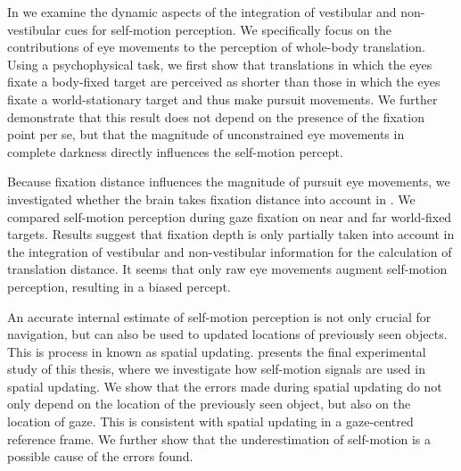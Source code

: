 In  we examine the dynamic aspects of the integration of vestibular and non-vestibular cues for self-motion perception. We specifically focus on the contributions of eye movements to the perception of whole-body translation. Using a psychophysical task, we first show that translations in which the eyes fixate a body-fixed target are perceived as shorter than those in which the eyes fixate a world-stationary target and thus make pursuit movements. We further demonstrate that this result does not depend on the presence of the fixation point per se, but that the magnitude of unconstrained eye movements in complete darkness directly influences the self-motion percept.

Because fixation distance influences the magnitude of pursuit eye movements, we investigated  whether the brain takes fixation distance into account in . We compared self-motion perception during gaze fixation on near and far world-fixed targets. Results suggest that fixation depth is only partially taken into account in the integration of vestibular and non-vestibular information for the calculation of translation distance. It seems that only raw eye movements augment self-motion perception, resulting in a biased percept.

An accurate internal estimate of self-motion perception is not only crucial for navigation, but can also be used to updated locations of previously seen objects. This is process in known as spatial updating.  presents the final experimental study of this thesis, where we investigate how self-motion signals are used in spatial updating. We show that the errors made during spatial updating do not only depend on the location of the previously seen object, but also on the location of gaze. This is consistent with spatial updating in a gaze-centred reference frame. We further show that the underestimation of self-motion is a possible cause of the errors found.
